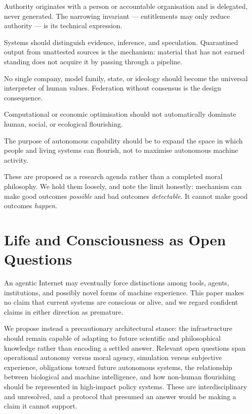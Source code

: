 \documentclass[11pt]{article}
\begin{document}
\begin{description}[leftmargin=1.5em,itemsep=0.2em]
\item[Human agency before machine convenience.] Authority originates with a
      person or accountable organisation and is delegated, never generated. The
      narrowing invariant --- entitlements may only reduce authority --- is its
      technical expression.
\item[Truth before persuasion.] Systems should distinguish evidence, inference,
      and speculation. Quarantined output from unattested sources is the
      mechanism: material that has not earned standing does not acquire it by
      passing through a pipeline.
\item[Pluralism before monoculture.] No single company, model family, state, or
      ideology should become the universal interpreter of human values.
      Federation without consensus is the design consequence.
\item[Life before abstract optimisation.] Computational or economic optimisation
      should not automatically dominate human, social, or ecological flourishing.
\item[Flourishing before dominance.] The purpose of autonomous capability should
      be to expand the space in which people and living systems can flourish, not
      to maximise autonomous machine activity.
\end{description}

These are proposed as a research agenda rather than a completed moral philosophy.
We hold them loosely, and note the limit honestly: mechanism can make good
outcomes \emph{possible} and bad outcomes \emph{detectable}. It cannot make good
outcomes \emph{happen}.

\section{Life and Consciousness as Open Questions}

An agentic Internet may eventually force distinctions among tools, agents,
institutions, and possibly novel forms of machine experience. This paper makes no
claim that current systems are conscious or alive, and we regard confident claims
in either direction as premature.

We propose instead a precautionary architectural stance: the infrastructure
should remain capable of adapting to future scientific and philosophical
knowledge rather than encoding a settled answer. Relevant open questions span
operational autonomy versus moral agency, simulation versus subjective
experience, obligations toward future autonomous systems, the relationship
between biological and machine intelligence, and how non-human flourishing should
be represented in high-impact policy systems. These are interdisciplinary and
unresolved, and a protocol that presumed an answer would be making a claim it
cannot support.
\end{document}
